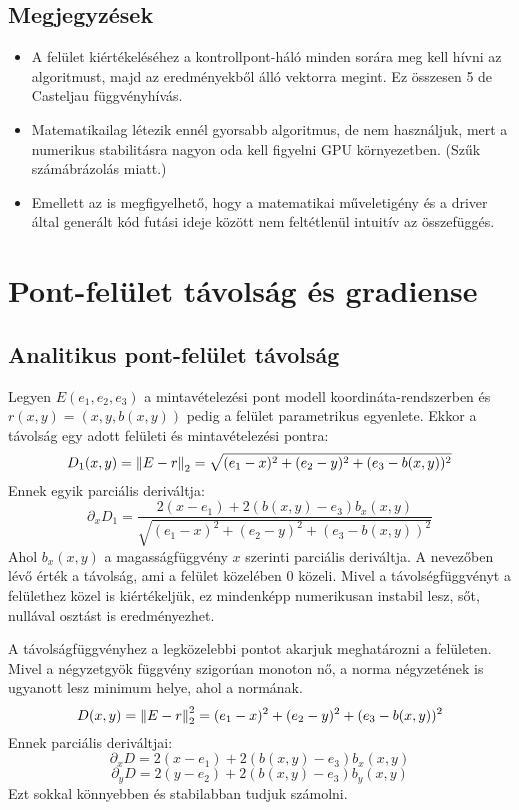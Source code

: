 \subsection{Megjegyzések}
\begin{itemize}
	\item A felület kiértékeléséhez a kontrollpont-háló minden sorára meg kell hívni az algoritmust, majd az eredményekből álló vektorra megint. Ez összesen 5 de Casteljau függvényhívás.
	\item Matematikailag létezik ennél gyorsabb algoritmus, de nem használjuk, mert a numerikus stabilitásra nagyon oda kell figyelni GPU környezetben. (Szűk számábrázolás miatt.)
	\item Emellett az is megfigyelhető, hogy a matematikai műveletigény és a driver által generált kód futási ideje között nem feltétlenül intuitív az összefüggés.
\end{itemize}


\section{Pont-felület távolság és gradiense}

\subsection{Analitikus pont-felület távolság}
Legyen $E(e_1,e_2,e_3)$ a mintavételezési pont modell koordináta-rendszerben és $r(x,y) = (x,y,b(x,y))$ pedig a felület parametrikus egyenlete. Ekkor a távolság egy adott felületi és mintavételezési pontra:
$$ D_1(x,y) = \norm{E-r}_2 = \sqrt{(e_1-x)^2 + (e_2-y)^2 + (e_3-b(x,y))^2} $$
Ennek egyik parciális deriváltja: 
$$ \partial_xD_1 = \frac{2(x-e_1) + 2(b(x,y)-e_3)b_x(x,y)}{\sqrt{(e_1-x)^2 + (e_2-y)^2 + (e_3-b(x,y))^2}} $$
Ahol $b_x(x,y)$ a magasságfüggvény $x$ szerinti parciális deriváltja. A nevezőben lévő érték a távolság, ami a felület közelében $0$ közeli. Mivel a távolségfüggvényt a felülethez közel is kiértékeljük, ez mindenképp numerikusan instabil lesz, sőt, nullával osztást is eredményezhet. 

A távolságfüggvényhez a legközelebbi pontot akarjuk meghatározni a felületen. Mivel a négyzetgyök függvény szigorúan monoton nő, a norma négyzetének is ugyanott lesz minimum helye, ahol a normának.
$$ D(x,y) = \norm{E-r}_2^2 = (e_1-x)^2 + (e_2-y)^2 + (e_3-b(x,y))^2 $$
Ennek parciális deriváltjai: 
$$ \partial_xD = 2(x-e_1) + 2(b(x,y)-e_3)b_x(x,y) $$
$$ \partial_yD = 2(y-e_2) + 2(b(x,y)-e_3)b_y(x,y) $$
Ezt sokkal könnyebben és stabilabban tudjuk számolni.

